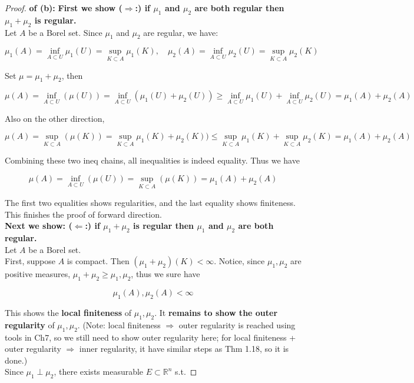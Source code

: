 \documentclass{qlnotes-export}
\begin{document}
\begin{proof}

\textbf{of (b):} \textbf{First we show (\(\Longrightarrow\):) if \(\mu_{1}\) and \(\mu_{2}\) are both regular then \(\mu_{1} + \mu_{2}\) is regular.}\\
Let \(A\) be a Borel set. Since \(\mu_{1}\) and \(\mu_{2}\) are regular, we have:

\[\mu_{1}(A) = \inf\limits_{A \subset U}\mu_{1}(U) = \sup\limits_{K \subset A}\mu_{1}(K),\quad\mu_{2}(A) = \inf\limits_{A \subset U}\mu_{2}(U) = \sup\limits_{K \subset A}\mu_{2}(K)\]

Set \(\mu = \mu_{1} + \mu_{2}\), then

\[\mu(A) = \inf\limits_{A \subset U}(\mu(U)) = \inf\limits_{A \subset U}(\mu_{1}(U) + \mu_{2}(U)) \geq \inf\limits_{A \subset U}\mu_{1}(U) + \inf\limits_{A \subset U}\mu_{2}(U) = \mu_{1}(A) + \mu_{2}(A)\]

Also on the other direction,

\[\mu(A) = \sup\limits_{K \subset A}(\mu(K)) = \sup\limits_{K \subset A}\mu_{1}(K) + \mu_{2}(K)) \leq \sup\limits_{K \subset A}\mu_{1}(K) + \sup\limits_{K \subset A}\mu_{2}(K) = \mu_{1}(A) + \mu_{2}(A)\]

Combining these two ineq chains, all inequalities is indeed equality. Thus we have

\[\mu(A) = \inf\limits_{A \subset U}(\mu(U)) = \sup\limits_{K \subset A}(\mu(K)) = \mu_{1}(A) + \mu_{2}(A)\]

The first two equalities shows regularities, and the last equality shows finiteness. This finishes the proof of forward direction.\\
\textbf{Next we show: (\(\Longleftarrow\):) if \(\mu_{1} + \mu_{2}\) is regular then \(\mu_{1}\) and \(\mu_{2}\) are both regular.}\\
Let \(A\) be a Borel set.\\
First, suppose \(A\) is compact. Then \((\mu_{1} + \mu_{2})(K) < \infty\). Notice, since \(\mu_{1},\mu_{2}\) are positive measures, \(\mu_{1} + \mu_{2} \geq \mu_{1},\mu_{2}\), thus we sure have

\[\mu_{1}(A),\mu_{2}(A) < \infty\]

This shows the \textbf{local finiteness} of \(\mu_{1},\mu_{2}\). It \textbf{remains to show the outer regularity} of \(\mu_{1},\mu_{2}\). (Note: local finiteness \(\Longrightarrow\) outer regularity is reached using tools in Ch7, so we still need to show outer regularity here; for local finiteness + outer regularity \(\Longrightarrow\) inner regularity, it have similar steps as Thm 1.18, so it is done.)\\
Since \(\mu_{1} \perp \mu_{2}\), there exists measurable \(E \subset {\mathbb{R}}^{n}\) s.t.


\end{proof}
\end{document}
